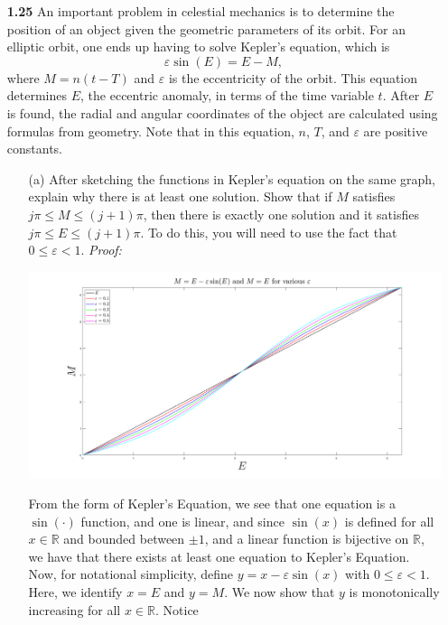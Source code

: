 \documentclass{article}
\begin{document}
\begin{itemize}
    \item[\textbf{1.25}] An important problem in celestial mechanics is to determine the position of an object given the geometric parameters of its orbit. For an elliptic orbit, one ends up having to solve Kepler's equation, which is 
    \[\varepsilon \sin(E) = E - M,\]
    where $M = n(t - T) $ and $\varepsilon$ is the eccentricity of the orbit. This equation determines $E$, the eccentric anomaly, in terms of the time variable $t$. After $E$ is found, the radial and angular coordinates of the object are calculated using formulas from geometry. Note that in this equation, $n$, $T$, and $\varepsilon$ are positive constants.
    \begin{itemize}
        \item[(a)] After sketching the functions in Kepler's equation on the same graph, explain why there is at least one solution. Show that if $M$ satisfies $j\pi \leq M \leq (j + 1)\pi$, then there is exactly one solution and it satisfies $j\pi \leq E \leq (j + 1)\pi$. To do this, you will need to use the fact that $0 \leq \varepsilon < 1$.
        \newline\newline
        \textit{Proof:} 
        \begin{center}
            \includegraphics[scale = 0.25]{kepler_eqns.png}
        \end{center}
        From the form of Kepler's Equation, we see that one equation is a $\sin(\cdot)$ function, and one is linear, and since $\sin(x)$ is defined for all $x \in \mathbb{R}$ and bounded between $\pm 1$, and a linear function is bijective on $\mathbb{R}$, we have that there exists at least one equation to Kepler's Equation.
        \newline\newline
        Now, for notational simplicity, define $y = x - \varepsilon\sin(x)$ with $0 \leq \varepsilon < 1$. Here, we identify $x = E$ and $y = M$. We now show that $y$ is monotonically increasing for all $x \in \mathbb{R}$. Notice

\end{itemize}
\end{itemize}
\end{document}
